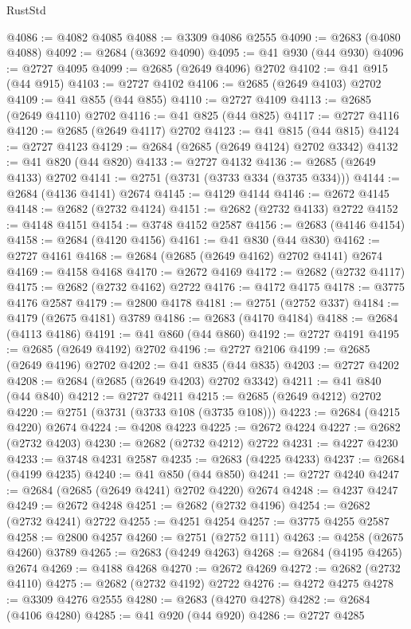 \begin{lexlean}{RustStd}
\begin{coremodule}
@4086 := @4082 @4085
@4088 := @3309 @4086 @2555
@4090 := @2683 (@4080 @4088)
@4092 := @2684 (@3692 @4090)
@4095 := @41 @930 (@44 @930)
@4096 := @2727 @4095
@4099 := @2685 (@2649 @4096) @2702
@4102 := @41 @915 (@44 @915)
@4103 := @2727 @4102
@4106 := @2685 (@2649 @4103) @2702
@4109 := @41 @855 (@44 @855)
@4110 := @2727 @4109
@4113 := @2685 (@2649 @4110) @2702
@4116 := @41 @825 (@44 @825)
@4117 := @2727 @4116
@4120 := @2685 (@2649 @4117) @2702
@4123 := @41 @815 (@44 @815)
@4124 := @2727 @4123
@4129 := @2684 (@2685 (@2649 @4124) @2702 @3342)
@4132 := @41 @820 (@44 @820)
@4133 := @2727 @4132
@4136 := @2685 (@2649 @4133) @2702
@4141 := @2751 (@3731 (@3733 @334 (@3735 @334)))
@4144 := @2684 (@4136 @4141) @2674
@4145 := @4129 @4144
@4146 := @2672 @4145
@4148 := @2682 (@2732 @4124)
@4151 := @2682 (@2732 @4133) @2722
@4152 := @4148 @4151
@4154 := @3748 @4152 @2587
@4156 := @2683 (@4146 @4154)
@4158 := @2684 (@4120 @4156)
@4161 := @41 @830 (@44 @830)
@4162 := @2727 @4161
@4168 := @2684 (@2685 (@2649 @4162) @2702 @4141) @2674
@4169 := @4158 @4168
@4170 := @2672 @4169
@4172 := @2682 (@2732 @4117)
@4175 := @2682 (@2732 @4162) @2722
@4176 := @4172 @4175
@4178 := @3775 @4176 @2587
@4179 := @2800 @4178
@4181 := @2751 (@2752 @337)
@4184 := @4179 (@2675 @4181) @3789
@4186 := @2683 (@4170 @4184)
@4188 := @2684 (@4113 @4186)
@4191 := @41 @860 (@44 @860)
@4192 := @2727 @4191
@4195 := @2685 (@2649 @4192) @2702
@4196 := @2727 @2106
@4199 := @2685 (@2649 @4196) @2702
@4202 := @41 @835 (@44 @835)
@4203 := @2727 @4202
@4208 := @2684 (@2685 (@2649 @4203) @2702 @3342)
@4211 := @41 @840 (@44 @840)
@4212 := @2727 @4211
@4215 := @2685 (@2649 @4212) @2702
@4220 := @2751 (@3731 (@3733 @108 (@3735 @108)))
@4223 := @2684 (@4215 @4220) @2674
@4224 := @4208 @4223
@4225 := @2672 @4224
@4227 := @2682 (@2732 @4203)
@4230 := @2682 (@2732 @4212) @2722
@4231 := @4227 @4230
@4233 := @3748 @4231 @2587
@4235 := @2683 (@4225 @4233)
@4237 := @2684 (@4199 @4235)
@4240 := @41 @850 (@44 @850)
@4241 := @2727 @4240
@4247 := @2684 (@2685 (@2649 @4241) @2702 @4220) @2674
@4248 := @4237 @4247
@4249 := @2672 @4248
@4251 := @2682 (@2732 @4196)
@4254 := @2682 (@2732 @4241) @2722
@4255 := @4251 @4254
@4257 := @3775 @4255 @2587
@4258 := @2800 @4257
@4260 := @2751 (@2752 @111)
@4263 := @4258 (@2675 @4260) @3789
@4265 := @2683 (@4249 @4263)
@4268 := @2684 (@4195 @4265) @2674
@4269 := @4188 @4268
@4270 := @2672 @4269
@4272 := @2682 (@2732 @4110)
@4275 := @2682 (@2732 @4192) @2722
@4276 := @4272 @4275
@4278 := @3309 @4276 @2555
@4280 := @2683 (@4270 @4278)
@4282 := @2684 (@4106 @4280)
@4285 := @41 @920 (@44 @920)
@4286 := @2727 @4285

\end{coremodule}
\end{lexlean}
